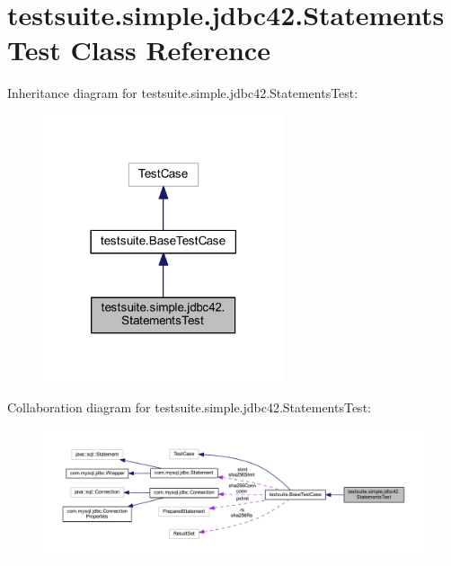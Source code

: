 \hypertarget{classtestsuite_1_1simple_1_1jdbc42_1_1_statements_test}{}\section{testsuite.\+simple.\+jdbc42.\+Statements\+Test Class Reference}
\label{classtestsuite_1_1simple_1_1jdbc42_1_1_statements_test}


Inheritance diagram for testsuite.\+simple.\+jdbc42.\+Statements\+Test\+:
\nopagebreak
\begin{figure}[H]
\begin{center}
\leavevmode
\includegraphics[width=201pt]{classtestsuite_1_1simple_1_1jdbc42_1_1_statements_test__inherit__graph}
\end{center}
\end{figure}


Collaboration diagram for testsuite.\+simple.\+jdbc42.\+Statements\+Test\+:
\nopagebreak
\begin{figure}[H]
\begin{center}
\leavevmode
\includegraphics[width=350pt]{classtestsuite_1_1simple_1_1jdbc42_1_1_statements_test__coll__graph}
\end{center}
\end{figure}
